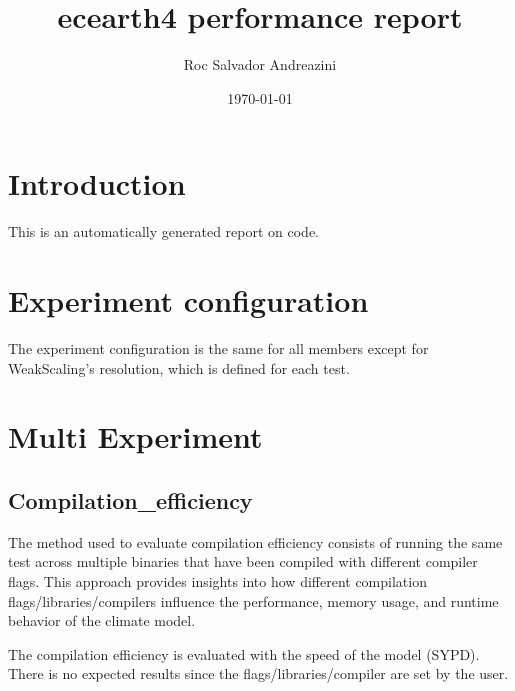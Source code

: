 \documentclass[11pt,a4paper,oldfontcommands]{article}
\title{ecearth4 performance report}
\author{Roc Salvador Andreazini}
\date{\today}
\begin{document}
\maketitle
\clearpage
\tableofcontents
\listoftables
\listoffigures
\clearpage
\clearpage
\section{Introduction}
This is an automatically generated report on \Model code.

\clearpage
\section{Experiment configuration}
The experiment configuration is the same for all members except for WeakScaling's resolution, which is defined for each test.

\begin{table}[H]
\centering
\caption{Experiment configuration}
\end{table}

\clearpage
\section{Multi Experiment}
\subsection{Compilation\_efficiency}
The method used to evaluate compilation efficiency consists of running the same test across multiple binaries that have been compiled with different compiler flags. This approach provides insights into how different compilation flags/libraries/compilers influence the performance, memory usage, and runtime behavior of the climate model.

The compilation efficiency is evaluated with the speed of the model (SYPD). There is no expected results since the flags/libraries/compiler are set by the user.

\begin{table}[H]
\centering
\caption{Compilation\_efficiency cases info.}
\end{table}


\begin{table}[H]
\centering
\caption{Compilation\_efficiency case comparison scalability.}
\end{table}
\end{document}
